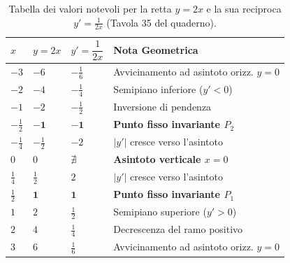 \documentclass[11pt,a4paper,oneside]{report}
\renewcommand{\arraystretch}{1.4}
\begin{document}
\begin{table}[htbp]
\centering
\small
\renewcommand{\arraystretch}{1.3}
\begin{tabularx}{0.88\textwidth}{>{\centering\arraybackslash}X >{\centering\arraybackslash}X >{\centering\arraybackslash}X >{\centering\arraybackslash}X}
\toprule
\textbf{$x$} & \textbf{$y = 2x$} & \textbf{$y' = \dfrac{1}{2x}$} & \textbf{Nota Geometrica} \\
\midrule
$-3$ & $-6$ & $-\frac{1}{6}$ & Avvicinamento ad asintoto orizz. $y=0$ \\
$-2$ & $-4$ & $-\frac{1}{4}$ & Semipiano inferiore ($y'<0$) \\
$-1$ & $-2$ & $-\frac{1}{2}$ & Inversione di pendenza \\
$-\frac{1}{2}$ & $\mathbf{-1}$ & $\mathbf{-1}$ & \textbf{Punto fisso invariante $P_2$} \\
$-\frac{1}{4}$ & $-\frac{1}{2}$ & $-2$ & $|y'|$ cresce verso l'asintoto \\
$0$ & $0$ & $\nexists$ & \textbf{Asintoto verticale $x = 0$} \\
$\frac{1}{4}$ & $\frac{1}{2}$ & $2$ & $|y'|$ cresce verso l'asintoto \\
$\frac{1}{2}$ & $\mathbf{1}$ & $\mathbf{1}$ & \textbf{Punto fisso invariante $P_1$} \\
$1$ & $2$ & $\frac{1}{2}$ & Semipiano superiore ($y'>0$) \\
$2$ & $4$ & $\frac{1}{4}$ & Decrescenza del ramo positivo \\
$3$ & $6$ & $\frac{1}{6}$ & Avvicinamento ad asintoto orizz. $y=0$ \\
\bottomrule
\end{tabularx}
\caption{Tabella dei valori notevoli per la retta $y = 2x$ e la sua reciproca $y' = \frac{1}{2x}$ (Tavola 35 del quaderno).}
\label{tab:reciproco_retta_4b}
\end{table}
\end{document}
